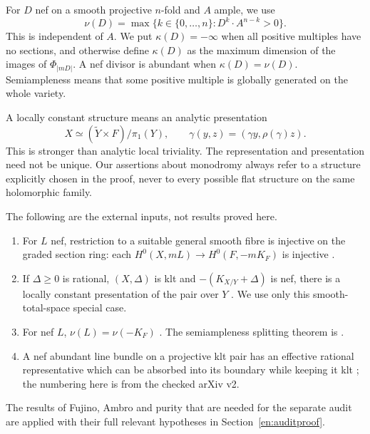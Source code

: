 \documentclass[12pt]{amsart}
\theoremstyle{definition}
\theoremstyle{remark}
\numberwithin{equation}{section}
\begin{document}
For $D$ nef on a smooth projective $n$-fold and $A$ ample, we use
\[
 \nu(D)=\max\{k\in\{0,\ldots,n\}:D^k\cdot A^{n-k}>0\}.
\]
This is independent of $A$. We put $\kappa(D)=-\infty$ when all positive multiples have no sections, and otherwise define $\kappa(D)$ as the maximum dimension of the images of $\Phi_{|mD|}$. A nef divisor is abundant when $\kappa(D)=\nu(D)$. Semiampleness means that some positive multiple is globally generated on the whole variety.

A locally constant structure means an analytic presentation
\begin{equation}\label{en:suspension}
 X\simeq(\widetilde Y\times F)/\pi_1(Y),\qquad
 \gamma(y,z)=(\gamma y,\rho(\gamma)z).
\end{equation}
This is stronger than analytic local triviality. The representation and presentation need not be unique. Our assertions about monodromy always refer to a structure explicitly chosen in the proof, never to every possible flat structure on the same holomorphic family.

The following are the external inputs, not results proved here.
\begin{enumerate}
\item For $L$ nef, restriction to a suitable general smooth fibre is injective on the graded section ring: each $H^0(X,mL)\to H^0(F,-mK_F)$ is injective \cite[Theorem 1.2]{en:EG}.
\item If $\Delta\geq0$ is rational, $(X,\Delta)$ is klt and $-(K_{X/Y}+\Delta)$ is nef, there is a locally constant presentation of the pair over $Y$ \cite[Theorem 4.6]{en:EIM}. We use only this smooth-total-space special case.
\item For nef $L$, $\nu(L)=\nu(-K_F)$ \cite[Theorem 1.5]{en:EIM}. The semiampleness splitting theorem is \cite[Theorem 1.6]{en:EIM}.
\item A nef abundant line bundle on a projective klt pair has an effective rational representative which can be absorbed into its boundary while keeping it klt \cite[Corollary 5.3 and Lemma 5.4]{en:CDB}; the numbering here is from the checked arXiv v2.
\end{enumerate}
The results of Fujino, Ambro and purity that are needed for the separate audit are applied with their full relevant hypotheses in Section~\ref{en:auditproof}.
\end{document}
